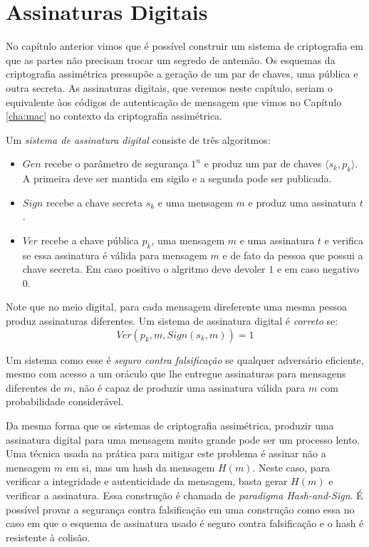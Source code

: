 \chapter{Assinaturas Digitais}
\label{cha:assinaturas-digitais}

No capítulo anterior vimos que é possível construir um sistema de criptografia em que as partes não precisam trocar um segredo de antemão.
Os esquemas da criptografia assimétrica pressupõe a geração de um par de chaves, uma pública e outra secreta.
As assinaturas digitais, que veremos neste capítulo, seriam o equivalente àos códigos de autenticação de mensagem que vimos no Capítulo \ref{cha:mac} no contexto da criptografia assimétrica.

Um {\em sistema de assinatura digital} consiste de três algoritmos:
\begin{itemize}
\item $Gen$ recebe o parâmetro de segurança $1^n$ e produz um par de chaves $\langle s_k, p_k \rangle$. 
A primeira deve ser mantida em sigilo e a segunda pode ser publicada.
\item $Sign$ recebe a chave secreta $s_k$ e uma mensagem $m$ e produz uma assinatura $t$.
\item $Ver$ recebe a chave pública $p_k$, uma mensagem $m$ e uma assinatura $t$ e verifica se essa assinatura é válida para mensagem $m$ e de fato da pessoa que possui a chave secreta.
Em caso positivo o algritmo deve devoler $1$ e em caso negativo $0$. 
\end{itemize}

Note que no meio digital, para cada mensagem direferente uma mesma pessoa produz assinaturas diferentes.
Um sistema de assinatura digital é {\em correto} se:
\begin{displaymath}
  Ver(p_k, m, Sign(s_k, m)) = 1
\end{displaymath}
 
Um sistema como esse é {\em seguro contra falsificação} se qualquer adversário eficiente, mesmo com acesso a um oráculo que lhe entregue assinaturas para mensagens diferentes de $m$, não é capaz de produzir uma assinatura válida para $m$ com probabilidade considerável.

Da mesma forma que os sistemas de criptografia assimétrica, produzir uma assinatura digital para uma mensagem muito grande pode ser um processo lento.
Uma técnica usada na prática para mitigar este problema é assinar não a mensagem $m$ em si, mas um hash da mensagem $H(m)$.
Neste caso, para verificar a integridade e autenticidade da mensagem, basta gerar $H(m)$ e verificar a assinatura.
Essa construção é chamada de {\em paradigma Hash-and-Sign}.
É possível provar a segurança contra falsificação em uma construção como essa no caso em que o esquema de assinatura usado é seguro contra falsificação e o hash é resistente à colisão.

